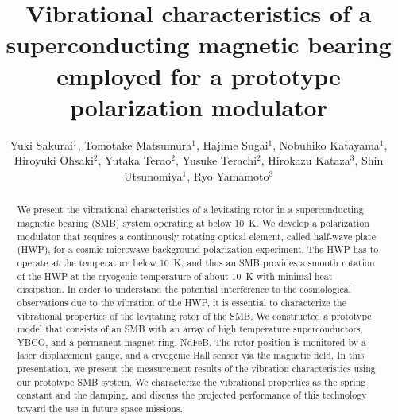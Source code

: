 \documentclass[a4paper,11pt]{jpconf}
\begin{document}
\title{Vibrational characteristics of a superconducting magnetic bearing employed for a prototype polarization modulator}

\author{Yuki Sakurai$^{1}$, Tomotake Matsumura$^{1}$, Hajime Sugai$^{1}$, Nobuhiko Katayama$^{1}$, Hiroyuki Ohsaki$^{2}$, Yutaka Terao$^{2}$, Yusuke Terachi$^{2}$, Hirokazu Kataza$^{3}$, Shin Utsunomiya$^{1}$, Ryo Yamamoto$^{3}$}
\vspace{2mm}
\address{
$^{1}$Kavli Institute for the Physics and Mathematics of the Universe (WPI),The University of Tokyo Institutes for Advanced Study, The University of Tokyo, 5-1-5 Kashiwanoha, Kashiwa, Chiba 277-8583, Japan \\
$^{2}$Graduate School of Frontier Sciences, The University of Tokyo, 5-1-5 Kashiwanoha, Kashiwa, Chiba 277-8561, Japan \\
$^{3}$Japan Aerospace Exploration Agency, Institute of Space and Astronautical Science (ISAS), 3-1-1 Yoshinodai, Chuo-ku, Sagamihara, Kanagawa 252-5210, Japan
}


\begin{abstract}
We present the vibrational characteristics of a levitating rotor in a superconducting magnetic bearing (SMB) system operating at below 10~K.
We develop a polarization modulator that requires a continuously rotating optical element, called half-wave plate (HWP), for a cosmic microwave background polarization experiment.
The HWP has to operate at the temperature below 10~K, and thus an SMB provides a smooth rotation of the HWP at the cryogenic temperature of about 10~K with minimal heat dissipation.
In order to understand the potential interference to the cosmological observations due to the vibration of the HWP,
it is essential to characterize the vibrational properties of the levitating rotor of the SMB.
We constructed a prototype model that consists of an SMB with an array of high temperature superconductors, YBCO, and a permanent magnet ring, NdFeB.
The rotor position is monitored by a laser displacement gauge, and a cryogenic Hall sensor via the magnetic field.
In this presentation, we present the measurement results of the vibration characteristics using our prototype SMB system.
We characterize the vibrational properties as the spring constant and the damping, and discuss the projected performance of this technology toward the use in future space missions.
\end{abstract}
\end{document}

